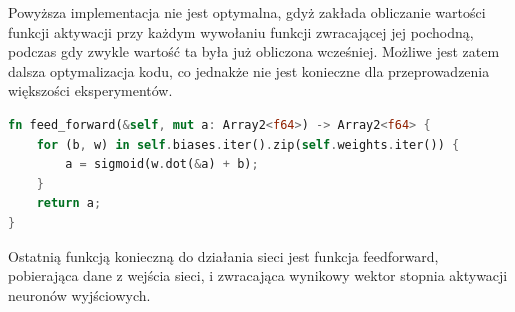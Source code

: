 \documentclass[12pt,twoside]{article}
\begin{document}
Powyższa implementacja nie jest optymalna, gdyż zakłada obliczanie wartości funkcji aktywacji przy każdym wywołaniu funkcji zwracającej jej pochodną, podczas gdy zwykle wartość ta była już obliczona wcześniej.
Możliwe jest zatem dalsza optymalizacja kodu, co jednakże nie jest konieczne dla przeprowadzenia większości eksperymentów.


\begin{lstlisting}[language=Rust,caption=Realizacja funkcji feed-forward,label={lst:sigmoid}]
fn feed_forward(&self, mut a: Array2<f64>) -> Array2<f64> {
	for (b, w) in self.biases.iter().zip(self.weights.iter()) {
		a = sigmoid(w.dot(&a) + b);
	}
	return a;
}
\end{lstlisting}

Ostatnią funkcją konieczną do działania sieci jest funkcja feedforward, pobierająca dane z wejścia sieci, i zwracająca wynikowy wektor stopnia aktywacji neuronów wyjściowych.
\end{document}
